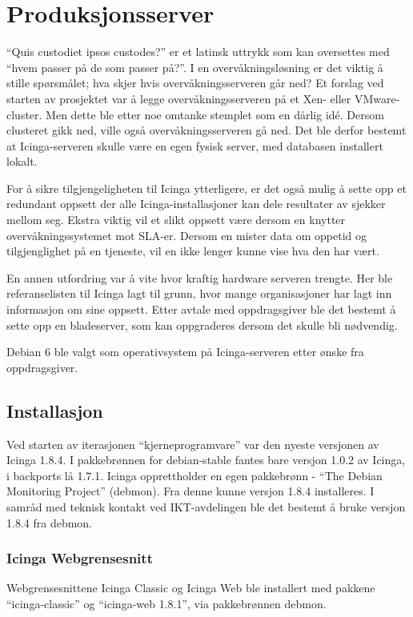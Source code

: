 \section{Produksjonsserver}
``Quis custodiet ipsos custodes?'' er et latinsk uttrykk som kan oversettes med ``hvem passer på de som passer på?''. I en overvåkningsløsning er det viktig å stille spørsmålet; hva skjer hvis overvåkningsserveren går ned? Et forslag ved starten av prosjektet var å legge overvåkningsserveren på et Xen- eller VMware-cluster. Men dette ble etter noe omtanke stemplet som en dårlig idé. Dersom clusteret gikk ned, ville også overvåkningsserveren gå ned. Det ble derfor bestemt at Icinga-serveren skulle være en egen fysisk server, med databasen installert lokalt.

For å sikre tilgjengeligheten til Icinga ytterligere, er det også mulig å sette opp et redundant oppsett der alle Icinga-installasjoner kan dele resultater av sjekker mellom seg. Ekstra viktig vil et slikt oppsett være dersom en knytter overvåkningssystemet mot SLA-er. Dersom en mister data om oppetid og tilgjenglighet på en tjeneste, vil en ikke lenger kunne vise hva den har vært.

En annen utfordring var å vite hvor kraftig hardware serveren trengte. Her ble referanselisten til Icinga lagt til grunn, hvor mange organisasjoner har lagt inn informasjon om sine oppsett\cite{icingainaction}. Etter avtale med oppdragsgiver ble det bestemt å sette opp en bladeserver, som kan oppgraderes dersom det skulle bli nødvendig. 

Debian 6 ble valgt som operativsystem på Icinga-serveren etter ønske fra oppdragsgiver. 
\subsection{Installasjon}
Ved starten av iterasjonen ``kjerneprogramvare'' var den nyeste versjonen av Icinga 1.8.4. I pakkebrønnen for debian-stable fantes bare versjon 1.0.2 av Icinga, i backports lå 1.7.1. Icinga opprettholder en egen pakkebrønn - ``The Debian Monitoring Project'' (debmon\cite{debmon}). Fra denne kunne versjon 1.8.4 installeres. I samråd med teknisk kontakt ved IKT-avdelingen ble det bestemt å bruke versjon 1.8.4 fra debmon.

\subsubsection{Icinga Webgrensesnitt}
Webgrensesnittene Icinga Classic og Icinga Web ble installert med pakkene ``icinga-classic'' og ``icinga-web 1.8.1'', via pakkebrønnen debmon. 

